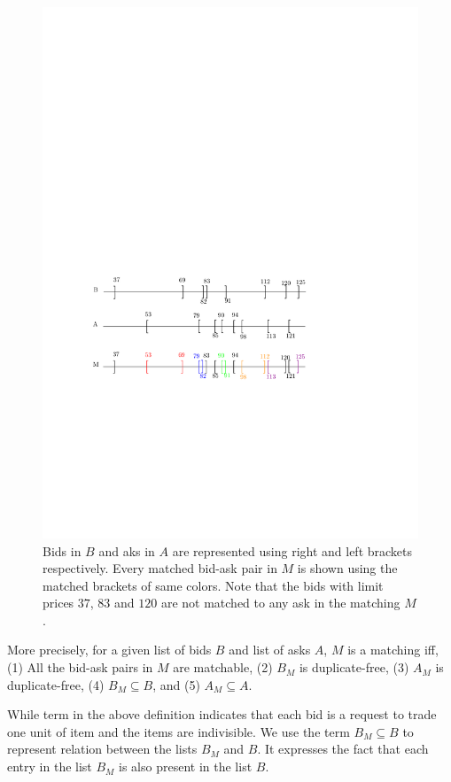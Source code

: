 \documentclass[a4paper,UKenglish,cleveref, autoref]{lipics-v2019}
\begin{document}
\begin{figure}[h!]
\centering
\includegraphics[width=.8\textwidth]{brack_matching.pdf}
\caption{ Bids in $B$ and aks in $A$ are represented using right and left brackets respectively. Every matched bid-ask pair in $M$ is shown using the matched brackets of same colors. Note that the bids with limit prices $37$, $83$ and $120$ are not matched to any ask in the matching $M$.}
\label{fig:matching}
\end{figure}

More precisely, for a given list of bids $B$ and list of asks $A$, $M$ is a matching iff, (1) All the bid-ask pairs in $M$ are matchable, (2) $B_M$ is duplicate-free, (3) $A_M$ is duplicate-free, (4) $B_M \subseteq B$, and (5) $A_M \subseteq A$.

\begin{definition}
\end{definition}
While term \emph{} in the above definition indicates that each bid is a request to trade one unit of item and the items are indivisible.  We use the term $B_M \subseteq B$  to represent  relation between the lists $B_M$ and $B$. It expresses the fact that each entry in the list $B_M$ is also present in the list $B$.
\end{document}

